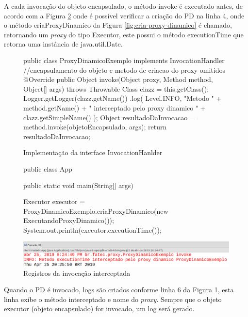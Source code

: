 \par A cada invocação do objeto encapsulado, o método invoke é executado antes, de acordo com a Figura \ref{fig:invoke-registrando-log} onde é possível verificar a criação do PD na linha 4, onde o método criaProxyDinamico da Figura \ref{fig:cria-proxy-dinamico} é chamado, retornando um \textit{proxy} do tipo Executor, este possui o método executionTime que retorna uma instância de java.util.Date.

\begin{figure}[H]
    \centering
    \caption{Implementação da interface InvocationHanlder}
\begin{java}
public class ProxyDinamicoExemplo implements InvocationHandler {
//encapsulamento do objeto e metodo de criacao do proxy omitidos
	@Override
	public Object invoke(Object proxy, Method method, Object[] args) throws Throwable {
		Class clazz = this.getClass();
		Logger.getLogger(clazz.getName())
		    .log(
                        Level.INFO, "Metodo " +
                        method.getName() + 
                        " interceptado pelo proxy dinamico " +
                        clazz.getSimpleName()
		    );
		Object resultadoDaInvocacao = method.invoke(objetoEncapsulado, args);
		return resultadoDaInvocacao;
	}
}
\end{java}
    \label{fig:invoke-implementacao}
\end{figure}

\begin{figure}[H]
    \centering
    \caption{Registros da invocação interceptada}
    \label{fig:invoke-registrando-log}
    \begin{java}
public class App {
	public static void main(String[] args) {
	
		Executor executor = ProxyDinamicoExemplo.criaProxyDinamico(new ExecutandoProxyDinamico());
		System.out.println(executor.executionTime());
	}
}
    \end{java}
    \includegraphics[scale=0.4]{src/imagens/cap2/invoke-registrando-log.png}
\end{figure}

Quando o PD é invocado, logs são criados conforme linha 6 da Figura \ref{fig:invoke-implementacao}, esta linha exibe o método interceptado e nome do \textit{proxy}. Sempre que o objeto executor (objeto encapsulado) for invocado, um log será gerado.

